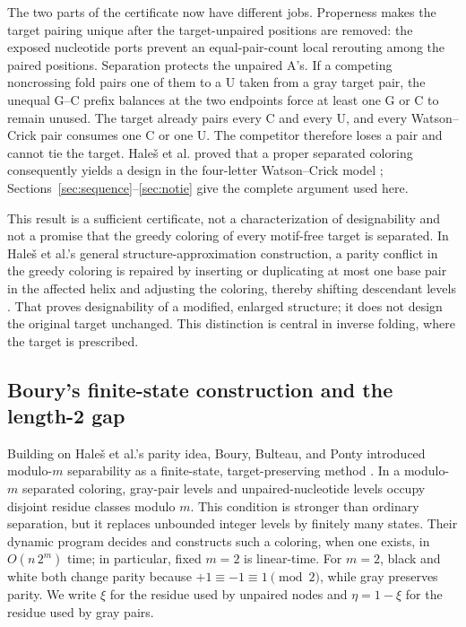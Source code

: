 \documentclass[11pt]{article}
\begin{document}
The two parts of the certificate now have different jobs.  Properness makes the target pairing unique after the target-unpaired positions are removed: the exposed nucleotide ports prevent an equal-pair-count local rerouting among the paired positions.  Separation protects the unpaired A's.  If a competing noncrossing fold pairs one of them to a U taken from a gray target pair, the unequal G--C prefix balances at the two endpoints force at least one G or C to remain unused.  The target already pairs every C and every U, and every Watson--Crick pair consumes one C or one U.  The competitor therefore loses a pair and cannot tie the target.  Hale\v{s} et al. proved that a proper separated coloring consequently yields a design in the four-letter Watson--Crick model \citep{hales2017}; Sections~\ref{sec:sequence}--\ref{sec:notie} give the complete argument used here.

This result is a sufficient certificate, not a characterization of designability and not a promise that the greedy coloring of every motif-free target is separated.  In Hale\v{s} et al.'s general structure-approximation construction, a parity conflict in the greedy coloring is repaired by inserting or duplicating at most one base pair in the affected helix and adjusting the coloring, thereby shifting descendant levels \citep{hales2017}.  That proves designability of a modified, enlarged structure; it does not design the original target unchanged.  This distinction is central in inverse folding, where the target is prescribed.

\subsection{Boury's finite-state construction and the length-2 gap}

Building on Hale\v{s} et al.'s parity idea, Boury, Bulteau, and Ponty introduced modulo-$m$ separability as a finite-state, target-preserving method \citep{boury2024,boury2025}.  In a modulo-$m$ separated coloring, gray-pair levels and unpaired-nucleotide levels occupy disjoint residue classes modulo $m$.  This condition is stronger than ordinary separation, but it replaces unbounded integer levels by finitely many states.  Their dynamic program decides and constructs such a coloring, when one exists, in $O(n\,2^m)$ time; in particular, fixed $m=2$ is linear-time.  For $m=2$, black and white both change parity because $+1\equiv-1\equiv1\pmod 2$, while gray preserves parity.  We write $\xi$ for the residue used by unpaired nodes and $\eta=1-\xi$ for the residue used by gray pairs.
\end{document}
